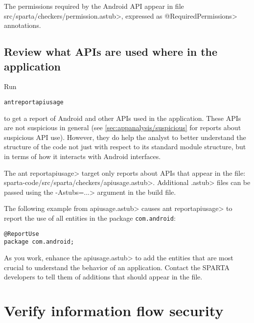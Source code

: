 The permissions required by the Android API appear in file
\<src/sparta/checkers/permission.astub>, expressed as
\<@RequiredPermissions> annotations.





\subsection{Review what APIs are used where in the application}

Run

\begin{alltt}
  ant reportapiusage
\end{alltt}

\noindent
to get a report of Android and other APIs used in the application.
These APIs are not
suspicious in general (see \ref{sec:appanalysis/suspicious} for reports
about suspicious API use). However, they do help the analyst to better
understand the structure of the code not just with respect to its standard
module structure, but in terms of how it interacts with Android interfaces.

The
\<ant reportapiusage> target only reports about APIs that appear in the file:
\<sparta-code/src/sparta/checkers/apiusage.astub>.
Additional \<.astub> files can be passed using the \<-Astubs=...> argument in the
build file.

The following example from \<apiusage.astub> causes \<ant reportapiusage>
to report the use of all entities in the package 
\verb|com.android|:

\begin{Verbatim}
@ReportUse                                                         
package com.android;
\end{Verbatim}

As you work, enhance the \<apiusage.astub> to add the entities that are
most crucial to understand the behavior of an application.  Contact the
SPARTA developers to tell them of additions that should appear in the file.


\section{Verify information flow security\label{verify-information-flow-security}}

